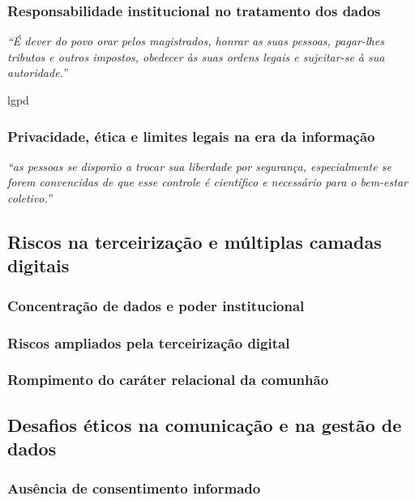 \subsubsection{Responsabilidade institucional no tratamento dos dados}

\textit{“É dever do povo orar pelos magistrados, honrar as suas pessoas, pagar-lhes tributos e outros impostos, obedecer às suas ordens legais e sujeitar-se à sua autoridade.”} \cite[Cap. XXIII]{cfw}

\gls{lgpd}

\subsubsection{Privacidade, ética e limites legais na era da informação}

\textit{“as pessoas se disporão a trocar sua liberdade por segurança, especialmente se forem convencidas de que esse controle é científico e necessário para o bem-estar coletivo.”} \cite[p. 165]{schaeffer2002}

\subsection{Riscos na terceirização e múltiplas camadas digitais}

\subsubsection{Concentração de dados e poder institucional}

\subsubsection{Riscos ampliados pela terceirização digital}

\subsubsection{Rompimento do caráter relacional da comunhão}

\subsection{Desafios éticos na comunicação e na gestão de dados}

\subsubsection{Ausência de consentimento informado}


